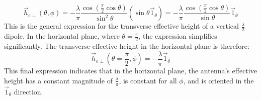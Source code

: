 \begin{equation}
	\vec{h}_{e\perp}(\theta, \phi) = -\frac{\lambda}{\pi} \frac{\cos(\frac{\pi}{2}\cos\theta)}{\sin^2\theta} (\sin\theta \vec{1}_\theta) = -\frac{\lambda}{\pi} \frac{\cos(\frac{\pi}{2}\cos\theta)}{\sin\theta} \vec{1}_\theta
	\label{eq:he_perp_general}
\end{equation}
\vspace{0.5em}
This is the general expression for the transverse effective height of a vertical $\frac{\lambda}{2}$ dipole. In the horizontal plane, where $\theta = \frac{\pi}{2}$, the expression simplifies significantly. The transverse effective height in the horizontal plane is therefore:
\begin{equation}
	\boxed{\vec{h}_{e\perp}\left(\theta=\frac{\pi}{2}, \phi\right) = -\frac{\lambda}{\pi} \vec{1}_\theta}
	\label{eq:he_perp_horizontal}
\end{equation}
\vspace{0.5em}
This final expression indicates that in the horizontal plane, the antenna's effective height has a constant magnitude of $\frac{\lambda}{\pi}$, is constant for all $\phi$, and is oriented in the $\vec{1}_\theta$ direction.

